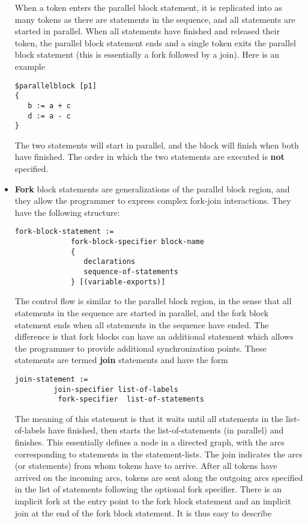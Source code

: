 \documentclass{article}
\begin{document}
\begin{itemize}
When a token enters the parallel block statement, it
is replicated into as many tokens as there are statements in
the sequence, and all statements are started in parallel.
When all statements have finished and released their token,
the parallel block statement
ends and a single token exits the parallel block statement (this
is essentially a fork followed by a join).
Here is an example
\begin{verbatim}
$parallelblock [p1] 
{
   b := a + c
   d := a - c
}
\end{verbatim} %
The two statements will start in parallel, and the block 
will finish when both have finished.  The
order in which the two statements are executed
is {\bf not} specified.
\item {\bf Fork} block statements are generalizations of the
parallel block region, and they allow the programmer to express 
complex fork-join interactions.
They have the following structure:
\begin{verbatim}
fork-block-statement :=
             fork-block-specifier block-name
             {
                declarations
                sequence-of-statements
             } [(variable-exports)]
\end{verbatim}
The control flow is similar to the parallel block region,
in the sense that all statements in the sequence are started
in parallel, and the fork block statement ends when all statements
in the sequence have ended.  The difference is that
fork blocks can have an additional statement which
allows the programmer to provide additional synchronization
points.  These statements are termed {\bf join} statements
and have the form
\begin{verbatim}
join-statement :=
         join-specifier list-of-labels 
          fork-specifier  list-of-statements
\end{verbatim}
The meaning of this statement is that it waits until all statements
in the list-of-labels have finished, then starts the list-of-statements
(in parallel) and finishes.  This essentially defines a node in a directed graph,
with the arcs corresponding to statements in the statement-lists.  
The join indicates the arcs (or statements) 
from whom tokens have to arrive.  After all tokens have arrived
on the incoming arcs, tokens are sent along the outgoing arcs specified
in the list of statements following the optional fork specifier.  There is an implicit fork
at the entry point to the fork block statement and an implicit join at the
end of the fork block statement.  It is thus easy to describe

\end{itemize}
\end{document}
